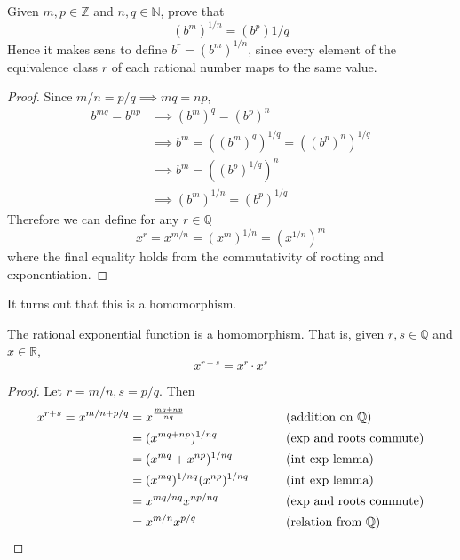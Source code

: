  \begin{theorem}
    \label{thm:rational-exponential-function}
    Given $m, p \in \mathbb{Z}$ and $n, q \in \mathbb{N}$, prove that 
    \begin{equation}
      (b^m)^{1/n} = (b^p){1/q}
    \end{equation}
    Hence it makes sens to define $b^r = (b^m)^{1/n}$, since every element of the equivalence class $r$ of each rational number maps to the same value. 
  \end{theorem} 
  \begin{proof}
    Since $m/n = p/q \implies mq = np$, 
    \begin{align}
      b^{mq} = b^{np} & \implies (b^m)^q = (b^p)^n \\
                      & \implies b^m = ((b^m)^q)^{1/q} = ((b^p)^n)^{1/q} \\
                      & \implies b^m = ((b^p)^{1/q})^n \\
                      & \implies (b^m)^{1/n} = (b^p)^{1/q}
    \end{align}
    Therefore we can define for any $r \in \mathbb{Q}$ 
    \begin{equation}
      x^r = x^{m/n} = (x^{m})^{1/n} = (x^{1/n})^m
    \end{equation}
    where the final equality holds from the commutativity of rooting and exponentiation. 
  \end{proof}

  It turns out that this is a homomorphism. 

  \begin{corollary}
    \label{thm:rational-exponential-function-is-a-homomorphism}
    The rational exponential function is a homomorphism. That is, given $r, s \in \mathbb{Q}$ and $x \in \mathbb{R}$, 
    \begin{equation}
      x^{r + s} = x^r \cdot x^s
    \end{equation}
  \end{corollary}
  \begin{proof}
    Let $r = m/n, s = p/q$. Then 
    \begin{align}
      x^{r+s} = x^{m/n + p/q} & = x^{\frac{mq + np}{nq}} && \tag{addition on $\mathbb{Q}$}\\
                              & = (x^{mq + np})^{1/nq} && \tag{exp and roots commute}\\
                              & = (x^{mq} + x^{np})^{1/nq} && \tag{int exp lemma}\\
                              & = (x^{mq})^{1/nq} (x^{np})^{1/nq} && \tag{int exp lemma}\\
                              & = x^{mq/nq} x^{np/nq} && \tag{exp and roots commute} \\
                              & = x^{m/n} x^{p/q} && \tag{relation from $\mathbb{Q}$}
    \end{align}
  \end{proof}

